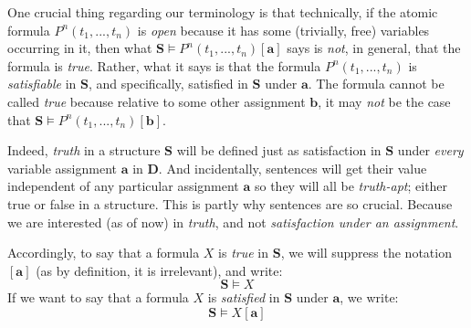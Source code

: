 One crucial thing regarding our terminology is that technically, if the atomic formula $P^n(t_1, ..., t_n)$ is \textit{open} because it has some (trivially, free) variables occurring in it, then what $\mathbf{S}\models P^n(t_1, ..., t_n)[\mathbf{a}]$ says is \textit{not}, in general, that the formula is \textit{true}. Rather, what it says is that the formula $P^n(t_1, ..., t_n)$ is \textit{satisfiable} in $\mathbf{S}$, and specifically, satisfied in $\mathbf{S}$ under $\mathbf{a}$. The formula cannot be called \textit{true} because relative to some other assignment $\mathbf{b}$, it may \textit{not} be the case that $\mathbf{S}\models P^n(t_1, ..., t_n)[\mathbf{b}]$. 

Indeed, \textit{truth} in a structure $\mathbf{S}$ will be defined just as satisfaction in $\mathbf{S}$ under \textit{every} variable assignment $\mathbf{a}$ in $\mathbf{D}$. And incidentally, sentences will get their value independent of any particular assignment $\mathbf{a}$ so they will all be \textit{truth-apt}; either true or false in a structure. This is partly why sentences are so crucial. Because we are interested (as of now) in \textit{truth}, and not \textit{satisfaction under an assignment}. 

Accordingly, to say that a formula $X$ is \textit{true} in $\mathbf{S}$, we will suppress the notation $[\mathbf{a}]$ (as by definition, it is irrelevant), and write: 
\[
\mathbf{S} \models X
\]
If we want to say that a formula $X$ is \textit{satisfied} in $\mathbf{S}$ under $\mathbf{a}$, we write: 
\[
\mathbf{S} \models X[\mathbf{a}]
\]


